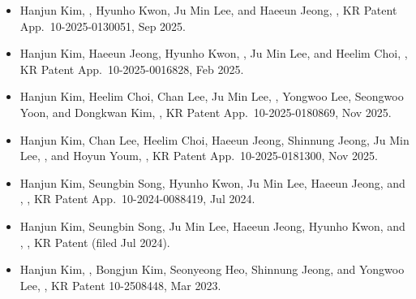 \documentclass{cv}
\begin{document}
\vspace{0.4em}
\printbibliography[check=ispost, heading=none]

\vspace{0.4em}

\begin{itemize}[itemsep=0.35em]
  \item Hanjun Kim, , Hyunho Kwon, Ju Min Lee, and Haeeun Jeong,
    ,
    KR Patent App.\ 10-2025-0130051, Sep 2025.

  \item Hanjun Kim, Haeeun Jeong, Hyunho Kwon, , Ju Min Lee, and Heelim Choi,
    ,
    KR Patent App.\ 10-2025-0016828, Feb 2025.

  \item Hanjun Kim, Heelim Choi, Chan Lee, Ju Min Lee, , Yongwoo Lee, Seongwoo Yoon, and Dongkwan Kim,
    ,
    KR Patent App.\ 10-2025-0180869, Nov 2025.

  \item Hanjun Kim, Chan Lee, Heelim Choi, Haeeun Jeong, Shinnung Jeong, Ju Min Lee, , and Hoyun Youm,
    ,
    KR Patent App.\ 10-2025-0181300, Nov 2025.

  \item Hanjun Kim, Seungbin Song, Hyunho Kwon, Ju Min Lee, Haeeun Jeong, and ,
    ,
    KR Patent App.\ 10-2024-0088419, Jul 2024.

  \item Hanjun Kim, Seungbin Song, Ju Min Lee, Haeeun Jeong, Hyunho Kwon, and ,
    ,
    KR Patent (filed Jul 2024).

  \item Hanjun Kim, , Bongjun Kim, Seonyeong Heo, Shinnung Jeong, and Yongwoo Lee,
    ,
    KR Patent 10-2508448, Mar 2023.
\end{itemize}
\end{document}
